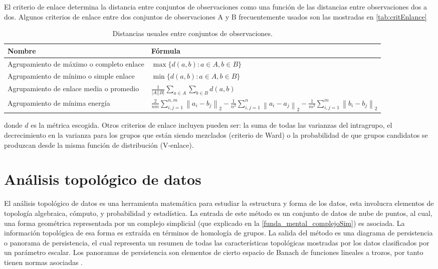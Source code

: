 El criterio de enlace determina la distancia entre conjuntos de observaciones como una función de las distancias entre observaciones dos a dos. Algunos criterios de enlace entre dos conjuntos de observaciones A y B frecuentemente usados son las mostradas en \autoref{tab:critEnlance}

\begin{table}[h]
	\centering
	\begin{tabular}{m{8cm} m{8cm}  }
		\toprule
		\textbf{Nombre} & \textbf{Fórmula}\\
		\midrule
		Agrupamiento de máximo o completo enlace & $\max \{d(a, b): a \in A, b \in B\}$ \\
		\hline
		Agrupamiento de mínimo o simple enlace & $\min \{d(a, b): a \in A, b \in B\}$ \\
		\hline
		Agrupamiento de enlace media o promedio & $\frac{1}{|A||B|} \sum_{a \in A} \sum_{b \in B} d(a, b)$ \\
		\hline
		Agrupamiento de mínima energía & \parbox[t]{8cm}{
			$\frac{2}{n m} \sum_{i,j=1}^{n,m}\left\|a_{i}-b_{j}\right\|_{2} -
			\frac{1}{n^{2}} \sum_{i,j=1}^{n}\left\|a_{i}-a_{j}\right\|_{2}-
			\frac{1}{m^{2}} \sum_{i, j=1}^{m}\left\|b_{i}-b_{j}\right\|_{2}$
		} \\
		\bottomrule
		\hline
	\end{tabular}
	\caption{Distancias usuales entre conjuntos de observaciones.}
	\label{tab:critEnlance}
\end{table}

donde $d$ es la métrica escogida. Otros criterios de enlace incluyen pueden ser: la suma de todas las varianzas del intragrupo, el decrecimiento en la varianza para los grupos que están siendo mezclados (criterio de Ward) o la probabilidad de que grupos candidatos se produzcan desde la misma función de distribución (V-enlace).

\section{Análisis topológico de datos}

El análisis topológico de datos es una herramienta matemática para estudiar la estructura y forma de los datos, esta involucra elementos de topología algebraica, cómputo, y probabilidad y estadística. 
La entrada de este método es un conjunto de datos de nube de puntos, al cual, una forma geométrica representada por un complejo simplicial (que explicado en la \autoref{funda_mental_complejoSim}) es asociada. La información topológica de esa forma es extraída en términos de homología de grupos. La salida del método es una diagrama de persistencia o panorama de persistencia, el cual representa un resumen de todas las características topológicas mostradas por los datos clasificados por un parámetro escalar. Los panoramas de persistencia son elementos de cierto espacio de Banach de funciones lineales a trozos, por tanto tienen normas asociadas \parencite{gideaTopologicalRecognitionCritical2020}.

